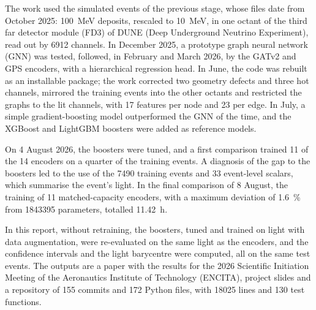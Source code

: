 \label{sec:resumo_atividades}

The work used the simulated events of the previous stage, whose files date from October 2025: \qty{100}{\MeV} deposits, rescaled to \qty{10}{\MeV}, in one octant of the third far detector module (FD3) of DUNE (Deep Underground Neutrino Experiment), read out by \num{6912} channels. In December 2025, a prototype graph neural network (GNN) was tested, followed, in February and March 2026, by the GATv2 and GPS encoders, with a hierarchical regression head. In June, the code was rebuilt as an installable package; the work corrected two geometry defects and three hot channels, mirrored the training events into the other octants and restricted the graphs to the lit channels, with \num{17} features per node and \num{23} per edge. In July, a simple gradient-boosting model outperformed the GNN of the time, and the XGBoost and LightGBM boosters were added as reference models.

On 4 August 2026, the boosters were tuned, and a first comparison trained \num{11} of the \num{14} encoders on a quarter of the training events. A diagnosis of the gap to the boosters led to the use of the \num{7490} training events and \num{33} event-level scalars, which summarise the event's light. In the final comparison of 8 August, the training of \num{11} matched-capacity encoders, with a maximum deviation of \qty{1.6}{\percent} from \num{1843395} parameters, totalled \qty{11.42}{\hour}.

In this report, without retraining, the boosters, tuned and trained on light with data augmentation, were re-evaluated on the same light as the encoders, and the confidence intervals and the light barycentre were computed, all on the same test events. The outputs are a paper with the results for the 2026 Scientific Initiation Meeting of the Aeronautics Institute of Technology (ENCITA), project slides and a repository of \num{155} commits and \num{172} Python files, with \num{18025} lines and \num{130} test functions.

